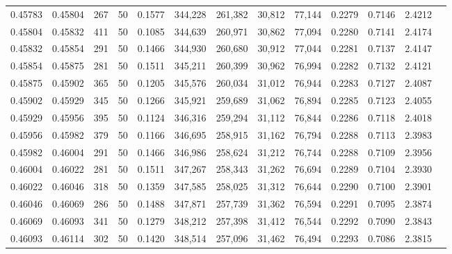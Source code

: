 \begin{tabular}{rrrrrrrrrrrrr}
0.45783 & 0.45804 &   267 &  50 &                                     0.1577 & 344,228 & 261,382 &  30,812 &  77,144 & 0.2279 & 0.7146 & 2.4212 \\
0.45804 & 0.45832 &   411 &  50 &                                     0.1085 & 344,639 & 260,971 &  30,862 &  77,094 & 0.2280 & 0.7141 & 2.4174 \\
0.45832 & 0.45854 &   291 &  50 &                                     0.1466 & 344,930 & 260,680 &  30,912 &  77,044 & 0.2281 & 0.7137 & 2.4147 \\
0.45854 & 0.45875 &   281 &  50 &                                     0.1511 & 345,211 & 260,399 &  30,962 &  76,994 & 0.2282 & 0.7132 & 2.4121 \\
0.45875 & 0.45902 &   365 &  50 &                                     0.1205 & 345,576 & 260,034 &  31,012 &  76,944 & 0.2283 & 0.7127 & 2.4087 \\
0.45902 & 0.45929 &   345 &  50 &                                     0.1266 & 345,921 & 259,689 &  31,062 &  76,894 & 0.2285 & 0.7123 & 2.4055 \\
0.45929 & 0.45956 &   395 &  50 &                                     0.1124 & 346,316 & 259,294 &  31,112 &  76,844 & 0.2286 & 0.7118 & 2.4018 \\
0.45956 & 0.45982 &   379 &  50 &                                     0.1166 & 346,695 & 258,915 &  31,162 &  76,794 & 0.2288 & 0.7113 & 2.3983 \\
0.45982 & 0.46004 &   291 &  50 &                                     0.1466 & 346,986 & 258,624 &  31,212 &  76,744 & 0.2288 & 0.7109 & 2.3956 \\
0.46004 & 0.46022 &   281 &  50 &                                     0.1511 & 347,267 & 258,343 &  31,262 &  76,694 & 0.2289 & 0.7104 & 2.3930 \\
0.46022 & 0.46046 &   318 &  50 &                                     0.1359 & 347,585 & 258,025 &  31,312 &  76,644 & 0.2290 & 0.7100 & 2.3901 \\
0.46046 & 0.46069 &   286 &  50 &                                     0.1488 & 347,871 & 257,739 &  31,362 &  76,594 & 0.2291 & 0.7095 & 2.3874 \\
0.46069 & 0.46093 &   341 &  50 &                                     0.1279 & 348,212 & 257,398 &  31,412 &  76,544 & 0.2292 & 0.7090 & 2.3843 \\
0.46093 & 0.46114 &   302 &  50 &                                     0.1420 & 348,514 & 257,096 &  31,462 &  76,494 & 0.2293 & 0.7086 & 2.3815 \\

\end{tabular}
